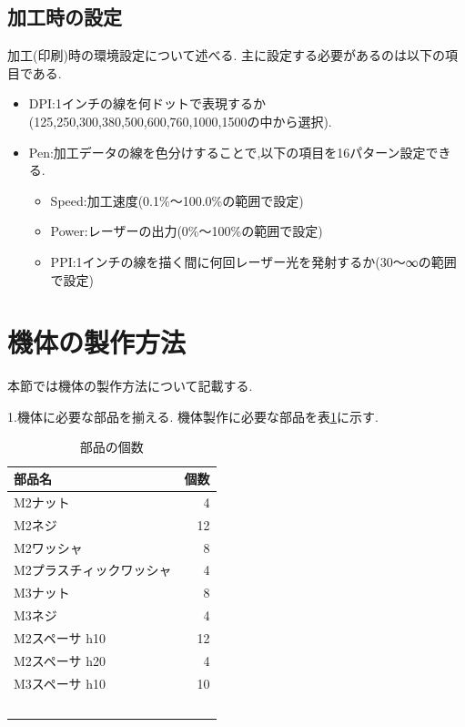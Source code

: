 \documentclass[12pt,oneside]{sotsuken_paper}
\begin{document}
\subsection{加工時の設定}
加工(印刷)時の環境設定について述べる.
主に設定する必要があるのは以下の項目である.

\begin{itemize}
	\item DPI:1インチの線を何ドットで表現するか(125,250,300,380,500,600,760,1000,1500の中から選択).
	\item Pen:加工データの線を色分けすることで,以下の項目を16パターン設定できる.
		\begin{itemize}
			\item Speed:加工速度(0.1\%～100.0\%の範囲で設定)
			\item Power:レーザーの出力(0\%～100\%の範囲で設定)
			\item PPI:1インチの線を描く間に何回レーザー光を発射するか(30～∞の範囲で設定)
		\end{itemize}
\end{itemize}

\section{機体の製作方法}
本節では機体の製作方法について記載する.


1.機体に必要な部品を揃える.
機体製作に必要な部品を表\ref{table:kitai}に示す.

\begin{table}[htbp]
	\begin{center}
		\caption{部品の個数}
		\begin{tabular}{|l|r|} \hline
			部品名 & 個数 \\ \hline 
			M2ナット & 4 \\ \hline
			M2ネジ & 12 \\ \hline
			M2ワッシャ　& 8　\\ \hline
			M2プラスチィックワッシャ & 4 \\ \hline
			M3ナット & 8 \\ \hline
			M3ネジ　& 4 \\ \hline
			M2スペーサ h10 & 12 \\ \hline
			M2スペーサ h20 & 4 \\ \hline	
			M3スペーサ h10 & 10 \\\hline
　　		\end{tabular}
		\label{table:kitai}
	\end{center}
\end{table}
\end{document}
